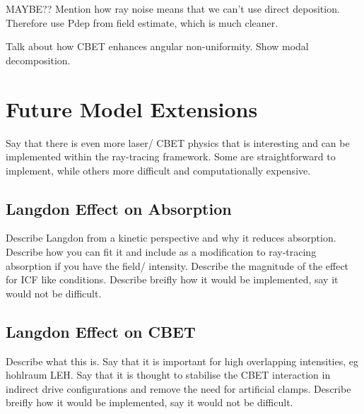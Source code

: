 MAYBE??
Mention how ray noise means that we can't use direct deposition.
Therefore use Pdep from field estimate, which is much cleaner.

Talk about how CBET enhances angular non-uniformity.
Show modal decomposition.


\section{Future Model Extensions}

Say that there is even more laser/ CBET physics that is interesting and can be implemented within the ray-tracing framework.
Some are straightforward to implement, while others more difficult and computationally expensive.

\subsection{Langdon Effect on Absorption}

Describe Langdon from a kinetic perspective and why it reduces absorption.
Describe how you can fit it and include as a modification to ray-tracing absorption if you have the field/ intensity.
Describe the magnitude of the effect for ICF like conditions.
Describe breifly how it would be implemented, say it would not be difficult.

\subsection{Langdon Effect on CBET}

Describe what this is.
Say that it is important for high overlapping intensities, eg hohlraum LEH.
Say that it is thought to stabilise the CBET interaction in indirect drive configurations and remove the need for artificial clamps.
Describe breifly how it would be implemented, say it would not be difficult.

